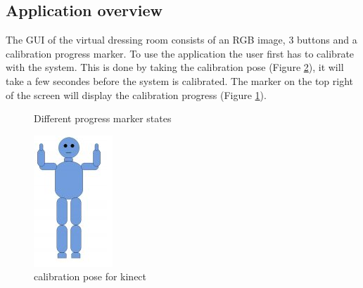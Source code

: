 \documentclass[twocolumn,a4paper]{article}
\begin{document}
\subsection{Application overview}
\label{sec:application_overview}
The GUI of the virtual dressing room consists of an RGB image, 3 buttons and a calibration progress marker. To use the application the user first has to calibrate with the system. This is done by taking the calibration pose (Figure \ref{fig:calibrationPose}), it will take a few secondes before the system is calibrated. The marker on the top right of the screen will display the calibration progress (Figure \ref{fig:progressmarker}).
\begin{figure}[h!]
\centering
	\caption{Different progress marker states} 
	\label{fig:progressmarker}
\end{figure}

\begin{figure}
\centering
\includegraphics[scale=0.5]{calibrationPose.png} 
\caption{calibration pose for kinect}
\label{fig:calibrationPose}
\end{figure}
\end{document}
